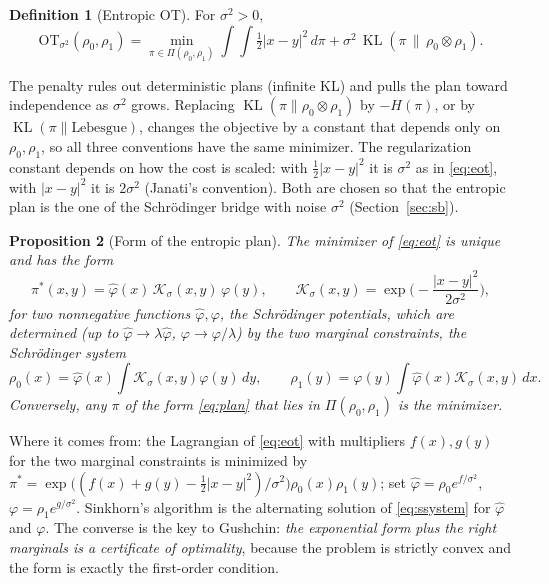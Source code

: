 \documentclass[11pt]{article}
\newcommand{\KL}{\operatorname{KL}}
\newcommand{\Kc}{\mathcal{K}}
\newcommand{\hphi}{\hat\varphi}
\theoremstyle{definition}
\newtheorem{definition}{Definition}[section]
\theoremstyle{plain}
\newtheorem{proposition}[definition]{Proposition}
\begin{document}
\begin{definition}[Entropic OT]
For $\sigma^2>0$,
\begin{equation}
  \label{eq:eot}
  \mathrm{OT}_{\sigma^2}(\rho_0,\rho_1)=\min_{\pi\in\Pi(\rho_0,\rho_1)}
  \int\!\!\int\tfrac12|x-y|^2\,d\pi+\sigma^2\,\KL(\pi\,\|\,\rho_0\otimes\rho_1).
\end{equation}
\end{definition}
The penalty rules out deterministic plans (infinite KL) and pulls the plan toward
independence as $\sigma^2$ grows. Replacing $\KL(\pi\|\rho_0\otimes\rho_1)$ by $-H(\pi)$,
or by $\KL(\pi\|\text{Lebesgue})$, changes the objective by a constant that depends only
on $\rho_0,\rho_1$, so all three conventions have the same minimizer. The regularization
constant depends on how the cost is scaled: with $\tfrac12|x-y|^2$ it is $\sigma^2$ as in
\eqref{eq:eot}, with $|x-y|^2$ it is $2\sigma^2$ (Janati's convention). Both are chosen so
that the entropic plan is the one of the Schr\"odinger bridge with noise $\sigma^2$
(Section~\ref{sec:sb}).

\begin{proposition}[Form of the entropic plan]
\label{prop:form}
The minimizer of \eqref{eq:eot} is unique and has the form
\begin{equation}
  \label{eq:plan}
  \pi^*(x,y)=\hphi(x)\,\Kc_{\sigma}(x,y)\,\varphi(y),\qquad
  \Kc_\sigma(x,y)=\exp\!\Big(-\frac{|x-y|^2}{2\sigma^2}\Big),
\end{equation}
for two nonnegative functions $\hphi,\varphi$, the \emph{Schr\"odinger potentials}, which are
determined (up to $\hphi\to\lambda\hphi$, $\varphi\to\varphi/\lambda$) by the two marginal
constraints, the \emph{Schr\"odinger system}
\begin{equation}
  \label{eq:ssystem}
  \rho_0(x)=\hphi(x)\int\Kc_\sigma(x,y)\varphi(y)\,dy,\qquad
  \rho_1(y)=\varphi(y)\int\hphi(x)\Kc_\sigma(x,y)\,dx .
\end{equation}
Conversely, any $\pi$ of the form \eqref{eq:plan} that lies in $\Pi(\rho_0,\rho_1)$ is the
minimizer.
\end{proposition}
Where it comes from: the Lagrangian of \eqref{eq:eot} with multipliers $f(x),g(y)$ for the
two marginal constraints is minimized by
$\pi^*=\exp\big((f(x)+g(y)-\tfrac12|x-y|^2)/\sigma^2\big)\rho_0(x)\rho_1(y)$; set
$\hphi=\rho_0e^{f/\sigma^2}$, $\varphi=\rho_1e^{g/\sigma^2}$. Sinkhorn's algorithm is the
alternating solution of \eqref{eq:ssystem} for $\hphi$ and $\varphi$. The converse is the
key to Gushchin: \emph{the exponential form plus the right marginals is a certificate of
optimality}, because the problem is strictly convex and the form is exactly the first-order
condition.
\end{document}
